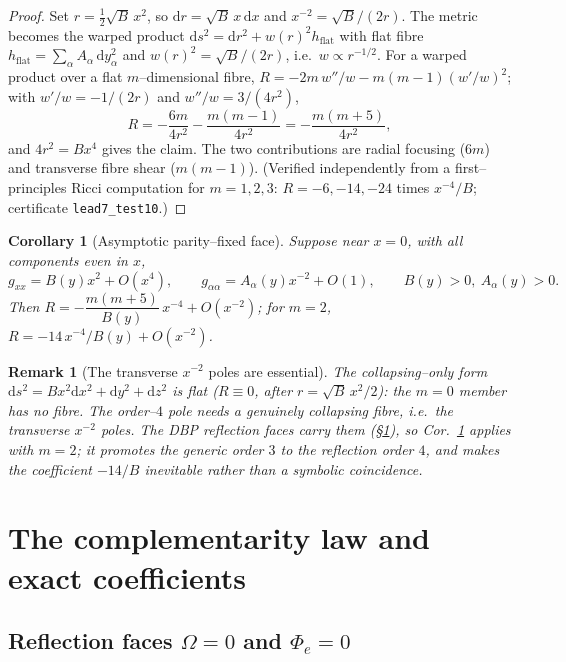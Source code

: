 \documentclass[11pt]{article}
\newtheorem{corollary}[theorem]{Corollary}
\newtheorem{remark}[theorem]{Remark}
\newcommand{\dd}{\mathrm{d}}
\begin{document}
\begin{proof}
Set $r=\tfrac12\sqrt B\,x^2$, so $\dd r=\sqrt B\,x\,\dd x$ and $x^{-2}=\sqrt B/(2r)$. The metric
becomes the warped product $\dd s^2=\dd r^2+w(r)^2h_{\mathrm{flat}}$ with flat fibre
$h_{\mathrm{flat}}=\sum_\alpha A_\alpha\,\dd y_\alpha^2$ and $w(r)^2=\sqrt B/(2r)$, i.e.\
$w\propto r^{-1/2}$. For a warped product over a flat $m$--dimensional fibre,
$R=-2m\,w''/w-m(m-1)(w'/w)^2$; with $w'/w=-1/(2r)$ and $w''/w=3/(4r^2)$,
\[
R=-\frac{6m}{4r^2}-\frac{m(m-1)}{4r^2}=-\frac{m(m+5)}{4r^2},
\]
and $4r^2=Bx^4$ gives the claim. The two contributions are radial focusing ($6m$) and
transverse fibre shear ($m(m-1)$). (Verified independently from a first--principles Ricci
computation for $m=1,2,3$: $R=-6,-14,-24$ times $x^{-4}/B$; certificate
\texttt{lead7\_test10}.)
\end{proof}

\begin{corollary}[Asymptotic parity--fixed face]
\label{lem:reflection}
Suppose near $x=0$, with all components even in $x$,
\[
g_{xx}=B(y)x^2+O(x^4),\qquad g_{\alpha\alpha}=A_\alpha(y)x^{-2}+O(1),\qquad B(y)>0,\ A_\alpha(y)>0.
\]
Then $R=-\dfrac{m(m+5)}{B(y)}\,x^{-4}+O(x^{-2})$; for $m=2$, $R=-14\,x^{-4}/B(y)+O(x^{-2})$.
\end{corollary}

\begin{remark}[The transverse $x^{-2}$ poles are essential]
\label{rem:transverse-poles}
The collapsing--only form $\dd s^2=Bx^2\dd x^2+\dd y^2+\dd z^2$ is flat ($R\equiv0$, after
$r=\sqrt B\,x^2/2$): the $m=0$ member has no fibre. The order--$4$ pole needs a genuinely
collapsing fibre, i.e.\ the transverse $x^{-2}$ poles. The DBP reflection faces carry them
(\S\ref{sec:law}), so Cor.~\ref{lem:reflection} applies with $m=2$; it promotes the generic
order $3$ to the reflection order $4$, and makes the coefficient $-14/B$ inevitable rather than
a symbolic coincidence.
\end{remark}

\section{The complementarity law and exact coefficients}
\label{sec:law}

\subsection{Reflection faces \texorpdfstring{$\Omega=0$ and $\Phi_e=0$}{Omega=0 and Phi\_e=0}}
\end{document}

